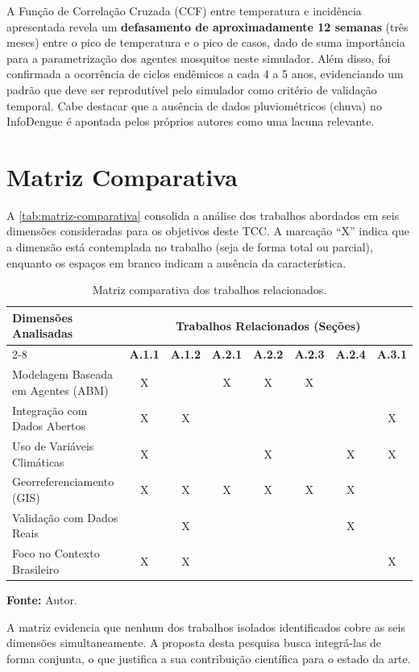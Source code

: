 \begin{apendicesenv}
A Função de Correlação Cruzada (CCF) entre temperatura e incidência apresentada
revela um \textbf{defasamento de aproximadamente 12 semanas} (três meses) entre o
pico de temperatura e o pico de casos, dado de suma importância para a
parametrização dos agentes mosquitos neste simulador. Além disso, foi confirmada a
ocorrência de ciclos endêmicos a cada 4 a 5 anos, evidenciando um padrão que deve
ser reprodutível pelo simulador como critério de validação temporal. Cabe destacar
que a ausência de dados pluviométricos (chuva) no InfoDengue é apontada pelos
próprios autores como uma lacuna relevante.

\section{Matriz Comparativa}
\label{ap:matriz}

A \autoref{tab:matriz-comparativa} consolida a análise dos trabalhos abordados em
seis dimensões consideradas para os objetivos deste TCC. A marcação ``X''
indica que a dimensão está contemplada no trabalho (seja de forma total ou parcial),
enquanto os espaços em branco indicam a ausência da característica.

\begin{table}[htb]
    \centering
    \caption{Matriz comparativa dos trabalhos relacionados.}
    \label{tab:matriz-comparativa}
    \vspace{0.2cm}
    \begin{tabular}{|p{}|c|c|c|c|c|c|c|}
        \hline
        \multirow{2}{4.5cm}{\textbf{Dimensões Analisadas}} &
        \multicolumn{7}{c|}{\textbf{Trabalhos Relacionados (Seções)}} \\
        \cline{2-8}
        & \textbf{A.1.1} & \textbf{A.1.2} & \textbf{A.2.1} & \textbf{A.2.2} &
        \textbf{A.2.3} & \textbf{A.2.4} & \textbf{A.3.1} \\
        \hline
        Modelagem Baseada em Agentes (ABM) & X &   & X & X & X &   &   \\
        \hline
        Integração com Dados Abertos       & X & X &   &   &   &   & X \\
        \hline
        Uso de Variáveis Climáticas        & X &   &   & X &   & X & X \\
        \hline
        Georreferenciamento (GIS)          & X & X & X & X & X & X &   \\
        \hline
        Validação com Dados Reais          &   & X &   &   &   & X &   \\
        \hline
        Foco no Contexto Brasileiro        & X & X &   &   &   &   & X \\
        \hline
    \end{tabular}
    \par\vspace{1ex}
    {\footnotesize \textbf{Fonte:} Autor.}
\end{table}

A matriz evidencia que nenhum dos trabalhos isolados identificados cobre as seis
dimensões simultaneamente. A proposta desta pesquisa busca
integrá-las de forma conjunta, o que justifica a sua contribuição
científica para o estado da arte.

\end{apendicesenv}
